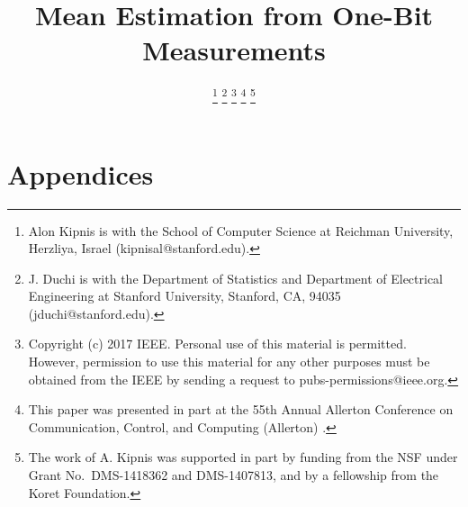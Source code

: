 \documentclass[letterpaper, 11pt]{IEEEtran}      %
\author{
    \IEEEauthorblockN{
Alon Kipnis and   
    John C. Duchi }

\thanks{
Alon Kipnis is with the School of Computer Science at Reichman University, Herzliya, Israel (kipnisal@stanford.edu).} 
\thanks{J. Duchi is with the Department of Statistics and Department of Electrical Engineering at Stanford University, Stanford, CA, 94035 (jduchi@stanford.edu).}
\thanks{Copyright (c) 2017 IEEE. Personal use of this material is permitted.  However, permission to use this material for any other purposes must be obtained from the IEEE by sending a request to pubs-permissions@ieee.org.}
\thanks{This paper was presented in part at the 55th Annual Allerton Conference on Communication, Control, and Computing (Allerton) \cite{KipnisAllerton2017}. }
\thanks{
The work of A. Kipnis was supported in part by funding from the NSF under Grant No.~DMS-1418362 and DMS-1407813, and by a fellowship from the Koret Foundation.}
}
\title{\LARGE \bf Mean Estimation from One-Bit Measurements}
\begin{document}
\graphicspath{{./Figs/}}
\maketitle
















\onecolumn 

\newpage

\section*{Appendices}









\end{document}
